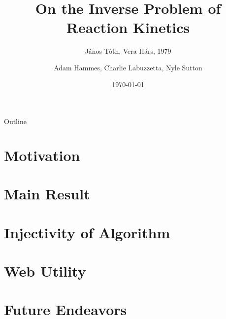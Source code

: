 \documentclass[11pt]{beamer}
\title{On the Inverse Problem of Reaction Kinetics}
\subtitle{J{\'a}nos T{\'o}th, Vera H{\'a}rs, 1979}
\author{Adam Hammes, Charlie Labuzzetta, Nyle Sutton}
\institute{Iowa State University}
\date{\today}
\begin{document}
	
	\begin{frame}
		\titlepage
	\end{frame}
	
	\begin{frame}{Outline}
		\tableofcontents
	\end{frame}
	
	\section{Motivation}
	\begin{frame}
	\end{frame}
	
	\section{Main Result}
	
	
	
	
	
	
	\section{Injectivity of Algorithm}

	
	
	

	
	\section{Web Utility}
	\begin{frame}
	\end{frame}

	\section{Future Endeavors}
	\begin{frame}
	\end{frame}
	
\end{document}
